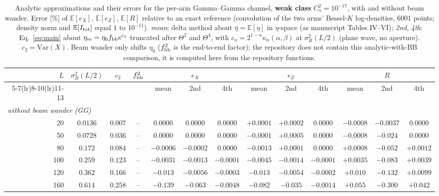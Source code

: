 \begin{table}[htbp]
\centering\scriptsize
\caption{Analytic approximations and their errors for the per-arm Gamma--Gamma channel, \textbf{weak class} $C_n^2=10^{-17}$, with and without beam wander. Error [\%] of $\mathbb E[e_X]$, $\mathbb E[e_Z]$, $\mathbb E[R]$ relative to an exact reference (convolution of the two arms' Bessel-$K$ log-densities, $6001$ points; density norm and $\mathbb E[I_{\rm tot}]$ equal $1$ to $10^{-11}$). \emph{mean}: delta method about $\bar\eta=\mathbb E[\eta]$ in $\eta$-space (as manuscript Tables IV--VI); \emph{2nd}, \emph{4th}: Eq.~\eqref{eq:main} about $\eta_m=\eta_0f_{\rm bb}e^{c_1}$ truncated after $\Theta^2$ and $\Theta^4$, with $c_n=2^{1-n}\kappa_n(\alpha,\beta)$ at $\sigma_R^2(L/2)$ (plane wave, no aperture). $c_2=\mathrm{Var}(X)$. Beam wander only shifts $\eta_0$ ($f_{\rm bb}^2$ is the end-to-end factor); the repository does not contain this analytic-with-BB comparison, it is computed here from the repository functions.}
\label{tab:perarm-weak}
\begin{tabular}{rcccccccccccc}
\toprule
$L$ & $\sigma_R^2(L/2)$ & $c_2$ & $f_{\rm bb}^2$ & \multicolumn{3}{c}{$e_X$} & \multicolumn{3}{c}{$e_Z$} & \multicolumn{3}{c}{$R$}\\
\cmidrule(lr){5-7}\cmidrule(lr){8-10}\cmidrule(lr){11-13}
 & & & & mean & 2nd & 4th & mean & 2nd & 4th & mean & 2nd & 4th\\
\midrule
\multicolumn{13}{l}{\emph{without beam wander (GG)}} \\
20 & $0.0136$ & $0.007$ & -- & $0.0000$ & $0.0000$ & $0.0000$ & $+0.0001$ & $+0.0002$ & $0.0000$ & $-0.0008$ & $-0.0037$ & $0.0000$ \\
50 & $0.0728$ & $0.036$ & -- & $0.0000$ & $0.0000$ & $0.0000$ & $-0.0001$ & $+0.0005$ & $0.0000$ & $-0.0008$ & $-0.024$ & $0.0000$ \\
80 & $0.172$ & $0.084$ & -- & $-0.0006$ & $-0.0002$ & $0.0000$ & $-0.0013$ & $+0.0001$ & $0.0000$ & $+0.0008$ & $-0.052$ & $+0.0012$ \\
100 & $0.259$ & $0.123$ & -- & $-0.0031$ & $-0.0013$ & $-0.0001$ & $-0.0045$ & $-0.0014$ & $-0.0001$ & $+0.0035$ & $-0.083$ & $+0.0039$ \\
120 & $0.362$ & $0.166$ & -- & $-0.013$ & $-0.0056$ & $-0.0003$ & $-0.013$ & $-0.0054$ & $-0.0002$ & $+0.010$ & $-0.132$ & $+0.0099$ \\
160 & $0.614$ & $0.258$ & -- & $-0.139$ & $-0.063$ & $-0.0048$ & $-0.082$ & $-0.035$ & $-0.0014$ & $+0.055$ & $-0.300$ & $+0.042$ \\

\end{tabular}
\end{table}

